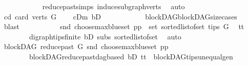 \begin{isabellebody}
\ \ \ \ \ \ \ \ \ \ \isamarkupfalse%
\ reduce{\isacharunderscore}{\kern0pt}past{\isachardot}{\kern0pt}simps\ induce{\isacharunderscore}{\kern0pt}subgraph{\isacharunderscore}{\kern0pt}verts\ \isamarkupfalse%
\ auto\isanewline
\ \ \ \ \ \ \ \ \isamarkupfalse%
\ cd{}{\isacharcolon}{\kern0pt}\ {\isachardoublequoteopen}card\ {\isacharparenleft}{\kern0pt}verts\ G{\isacharparenright}{\kern0pt}\ {\isachargreater}{\kern0pt}\ {}{\isachardoublequoteclose}\ \isamarkupfalse%
\ cDm\ bD\isanewline
\ \ \ \ \ \ \ \ \ \ \isamarkupfalse%
\ blockDAG{\isachardot}{\kern0pt}blockDAG{\isacharunderscore}{\kern0pt}size{\isacharunderscore}{\kern0pt}cases\ \isamarkupfalse%
\ blast\ \isanewline
\ \ \ \ \ \ \ \ \isamarkupfalse%
\ {\isachardoublequoteopen}{\isacharparenleft}{\kern0pt}snd\ {\isacharparenleft}{\kern0pt}choose{\isacharunderscore}{\kern0pt}max{\isacharunderscore}{\kern0pt}blue{\isacharunderscore}{\kern0pt}set\ pp{\isacharparenright}{\kern0pt}{\isacharparenright}{\kern0pt}\ {\isasymin}\ set\ {\isacharparenleft}{\kern0pt}sorted{\isacharunderscore}{\kern0pt}list{\isacharunderscore}{\kern0pt}of{\isacharunderscore}{\kern0pt}set\ {\isacharparenleft}{\kern0pt}tips\ G{\isacharparenright}{\kern0pt}{\isacharparenright}{\kern0pt}{\isachardoublequoteclose}\ \isamarkupfalse%
\ tt{}\isanewline
\ \ \ \ \ \ \ \ digraph{\isachardot}{\kern0pt}tips{\isacharunderscore}{\kern0pt}finite\ bD\ subs\ sorted{\isacharunderscore}{\kern0pt}list{\isacharunderscore}{\kern0pt}of{\isacharunderscore}{\kern0pt}set{\isacharparenleft}{\kern0pt}{}{\isacharparenright}{\kern0pt}\ \isamarkupfalse%
\ auto\isanewline
\ \ \ \ \ \ \ \ \isamarkupfalse%
\ \isanewline
\ \ \ \ \ \ \ \ \isamarkupfalse%
\ {\isachardoublequoteopen}blockDAG\ {\isacharparenleft}{\kern0pt}reduce{\isacharunderscore}{\kern0pt}past\ G\ {\isacharparenleft}{\kern0pt}snd\ {\isacharparenleft}{\kern0pt}choose{\isacharunderscore}{\kern0pt}max{\isacharunderscore}{\kern0pt}blue{\isacharunderscore}{\kern0pt}set\ pp{\isacharparenright}{\kern0pt}{\isacharparenright}{\kern0pt}{\isacharparenright}{\kern0pt}{\isachardoublequoteclose}\ \isamarkupfalse%
\ \isanewline
\ \ \ \ \ \ \ \ blockDAG{\isachardot}{\kern0pt}reduce{\isacharunderscore}{\kern0pt}past{\isacharunderscore}{\kern0pt}dagbased\ bD\ tt{}\ \ blockDAG{\isachardot}{\kern0pt}tips{\isacharunderscore}{\kern0pt}unequal{\isacharunderscore}{\kern0pt}gen\ \isanewline

\end{isabellebody}
